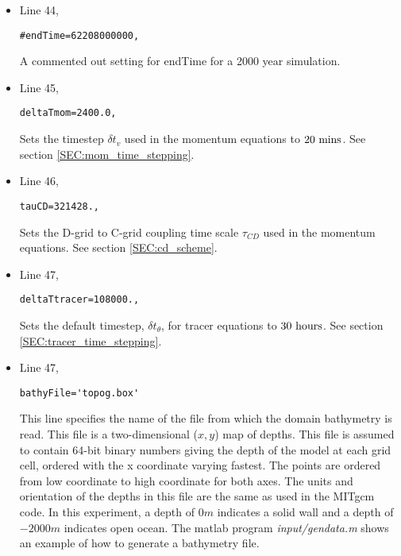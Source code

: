 {\begin{itemize}
\item Line 44,
\begin{verbatim}
#endTime=62208000000,
\end{verbatim}
A commented out setting for endTime for a 2000 year simulation.

\item Line 45,
\begin{verbatim}
deltaTmom=2400.0,
\end{verbatim}
Sets the timestep $\delta t_{v}$ used in the momentum equations to
$20~{\rm mins}$.
See section \ref{SEC:mom_time_stepping}.


\item Line 46,
\begin{verbatim}
tauCD=321428.,
\end{verbatim}
Sets the D-grid to C-grid coupling time scale $\tau_{CD}$ used in the momentum equations.
See section \ref{SEC:cd_scheme}.


\item Line 47,
\begin{verbatim}
deltaTtracer=108000.,
\end{verbatim}
Sets the default timestep, $\delta t_{\theta}$, for tracer equations to
$30~{\rm hours}$.
See section \ref{SEC:tracer_time_stepping}.


\item Line 47,
\begin{verbatim}
bathyFile='topog.box'
\end{verbatim}
This line specifies the name of the file from which the domain
bathymetry is read. This file is a two-dimensional ($x,y$) map of
depths. This file is assumed to contain 64-bit binary numbers 
giving the depth of the model at each grid cell, ordered with the x 
coordinate varying fastest. The points are ordered from low coordinate
to high coordinate for both axes. The units and orientation of the
depths in this file are the same as used in the MITgcm code. In this
experiment, a depth of $0m$ indicates a solid wall and a depth
of $-2000m$ indicates open ocean. The matlab program
{\it input/gendata.m} shows an example of how to generate a
bathymetry file.



\end{itemize}}
